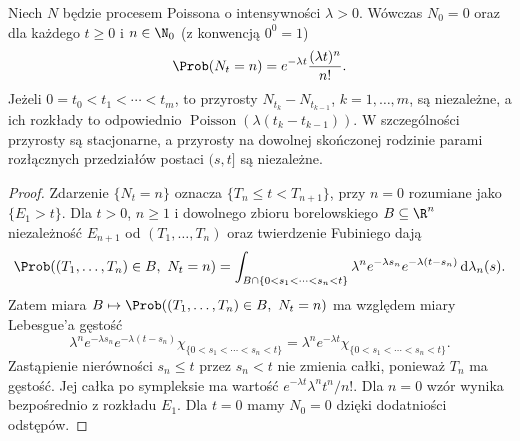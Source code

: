 \begin{twierdzenie}
\label{thm:poisson-fdd}
Niech $N$ będzie procesem Poissona o intensywności $\lambda>0$.
Wówczas $N_0=0$ oraz dla każdego $t\ge0$ i $n\in\N_0$
(z konwencją $0^0=1$)
\[
\Prob(N_t=n)=e^{-\lambda t}\frac{(\lambda t)^n}{n!}.
\]
Jeżeli $0=t_0<t_1<\cdots<t_m$, to przyrosty
$N_{t_k}-N_{t_{k-1}}$, $k=1,\ldots,m$, są niezależne, a ich
rozkłady to odpowiednio
$\operatorname{Poisson}(\lambda(t_k-t_{k-1}))$.
W szczególności przyrosty są stacjonarne, a przyrosty
na dowolnej skończonej rodzinie parami rozłącznych
przedziałów postaci $(s,t]$ są niezależne.
\end{twierdzenie}
\begin{proof}
Zdarzenie $\{N_t=n\}$ oznacza $\{T_n\le t<T_{n+1}\}$,
przy $n=0$ rozumiane jako $\{E_1>t\}$.
Dla $t>0$, $n\ge1$ i dowolnego zbioru borelowskiego
$B\subseteq\R^n$ niezależność $E_{n+1}$ od
$(T_1,\ldots,T_n)$ oraz twierdzenie Fubiniego dają
\[
\Prob((T_1,\ldots,T_n)\in B,\ N_t=n)
=\int_{B\cap\{0<s_1<\cdots<s_n<t\}}
\lambda^n e^{-\lambda s_n}
e^{-\lambda(t-s_n)}\,\mathrm d\lambda_n(s).
\]
Zatem miara
$B\mapsto\Prob((T_1,\ldots,T_n)\in B,\ N_t=n)$
ma względem miary Lebesgue'a gęstość
\[
\lambda^n e^{-\lambda s_n}e^{-\lambda(t-s_n)}
\chi_{\{0<s_1<\cdots<s_n<t\}}
=\lambda^n e^{-\lambda t}\chi_{\{0<s_1<\cdots<s_n<t\}}.
\]
Zastąpienie nierówności $s_n\le t$ przez $s_n<t$
nie zmienia całki, ponieważ $T_n$ ma gęstość.
Jej całka po sympleksie ma wartość
$e^{-\lambda t}\lambda^n t^n/n!$. Dla $n=0$ wzór wynika
bezpośrednio z rozkładu $E_1$. Dla $t=0$ mamy
$N_0=0$ dzięki dodatniości odstępów.


\end{proof}
